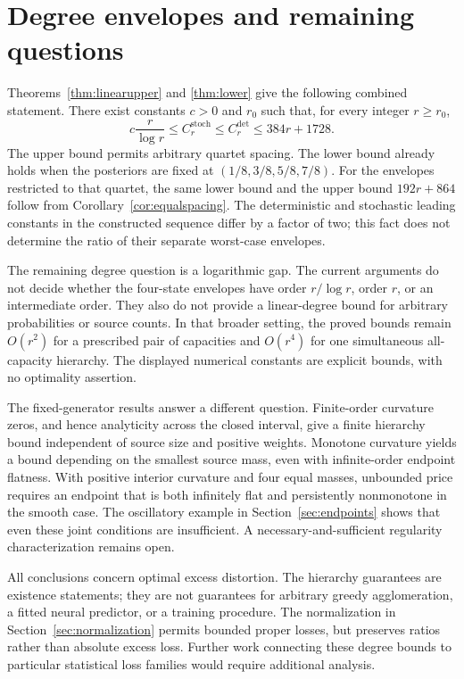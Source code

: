 \documentclass[11pt]{article}
\theoremstyle{definition}\newtheorem{definition}[theorem]{Definition}
\theoremstyle{remark}\newtheorem{remark}[theorem]{Remark}
\newcommand{\detp}{\mathrm{det}}
\newcommand{\stp}{\mathrm{stoch}}
\begin{document}
\section{Degree envelopes and remaining questions}
\label{sec:conclusion}
Theorems~\ref{thm:linearupper} and \ref{thm:lower} give the following combined statement. There exist constants $c>0$ and $r_0$ such that, for every integer $r\ge r_0$,
\begin{equation}
c\frac{r}{\log r}\le C_r^{\stp}\le C_r^{\detp}\le384r+1728.
\label{eq:mainbounds}
\end{equation}
The upper bound permits arbitrary quartet spacing. The lower bound already holds when the posteriors are fixed at $(1/8,3/8,5/8,7/8)$. For the envelopes restricted to that quartet, the same lower bound and the upper bound $192r+864$ follow from Corollary~\ref{cor:equalspacing}. The deterministic and stochastic leading constants in the constructed sequence differ by a factor of two; this fact does not determine the ratio of their separate worst-case envelopes.

The remaining degree question is a logarithmic gap. The current arguments do not decide whether the four-state envelopes have order $r/\log r$, order $r$, or an intermediate order. They also do not provide a linear-degree bound for arbitrary probabilities or source counts. In that broader setting, the proved bounds remain $O(r^2)$ for a prescribed pair of capacities and $O(r^4)$ for one simultaneous all-capacity hierarchy. The displayed numerical constants are explicit bounds, with no optimality assertion.

The fixed-generator results answer a different question. Finite-order curvature zeros, and hence analyticity across the closed interval, give a finite hierarchy bound independent of source size and positive weights. Monotone curvature yields a bound depending on the smallest source mass, even with infinite-order endpoint flatness. With positive interior curvature and four equal masses, unbounded price requires an endpoint that is both infinitely flat and persistently nonmonotone in the smooth case. The oscillatory example in Section~\ref{sec:endpoints} shows that even these joint conditions are insufficient. A necessary-and-sufficient regularity characterization remains open.

All conclusions concern optimal excess distortion. The hierarchy guarantees are existence statements; they are not guarantees for arbitrary greedy agglomeration, a fitted neural predictor, or a training procedure. The normalization in Section~\ref{sec:normalization} permits bounded proper losses, but preserves ratios rather than absolute excess loss. Further work connecting these degree bounds to particular statistical loss families would require additional analysis.
\end{document}
